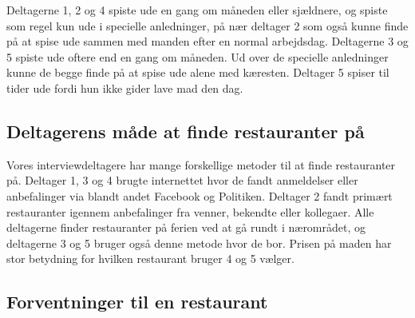 \documentclass[a4paper, 12pt]{article}
\begin{document}
Deltagerne 1, 2 og 4 spiste ude en gang om måneden eller sjældnere, og spiste som regel
kun ude i specielle anledninger, på nær deltager 2 som også kunne finde på at spise ude
sammen med manden efter en normal arbejdsdag.
Deltagerne 3 og 5 spiste ude oftere end en gang om måneden. Ud over de specielle anledninger
kunne de begge finde på at spise ude alene med kæresten. Deltager 5 spiser til tider ude
fordi hun ikke gider lave mad den dag.



\subsection{Deltagerens måde at finde restauranter på}

Vores interviewdeltagere har mange forskellige metoder til at finde restauranter på.
Deltager 1, 3 og 4 brugte internettet hvor de fandt anmeldelser eller anbefalinger via
blandt andet Facebook og Politiken. Deltager 2 fandt primært restauranter igennem
anbefalinger fra venner, bekendte eller kollegaer. Alle deltagerne finder restauranter
på ferien ved at gå rundt i nærområdet, og deltagerne 3 og 5 bruger også denne
metode hvor de bor. Prisen på maden har stor betydning for hvilken restaurant bruger
4 og 5 vælger.


\subsection{Forventninger til en restaurant}
\end{document}
